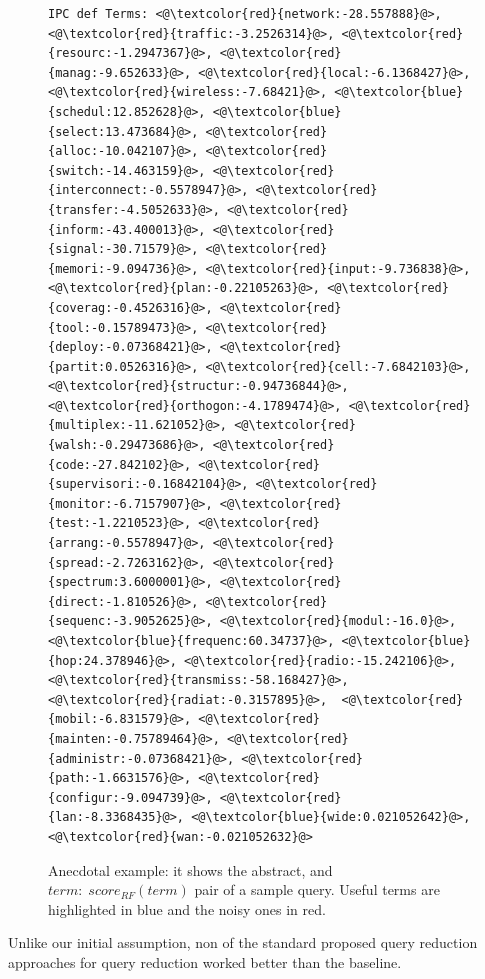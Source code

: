 \begin{figure}[htpb]
\begin{framed}
\begin{lstlisting}[basicstyle=\scriptsize\ttfamily , linewidth=\columnwidth,breaklines=true]
IPC def Terms: <@\textcolor{red}{network:-28.557888}@>, <@\textcolor{red}{traffic:-3.2526314}@>, <@\textcolor{red}{resourc:-1.2947367}@>, <@\textcolor{red}{manag:-9.652633}@>, <@\textcolor{red}{local:-6.1368427}@>, <@\textcolor{red}{wireless:-7.68421}@>, <@\textcolor{blue}{schedul:12.852628}@>, <@\textcolor{blue}{select:13.473684}@>, <@\textcolor{red}{alloc:-10.042107}@>, <@\textcolor{red}{switch:-14.463159}@>, <@\textcolor{red}{interconnect:-0.5578947}@>, <@\textcolor{red}{transfer:-4.5052633}@>, <@\textcolor{red}{inform:-43.400013}@>, <@\textcolor{red}{signal:-30.71579}@>, <@\textcolor{red}{memori:-9.094736}@>, <@\textcolor{red}{input:-9.736838}@>, <@\textcolor{red}{plan:-0.22105263}@>, <@\textcolor{red}{coverag:-0.4526316}@>, <@\textcolor{red}{tool:-0.15789473}@>, <@\textcolor{red}{deploy:-0.07368421}@>, <@\textcolor{red}{partit:0.0526316}@>, <@\textcolor{red}{cell:-7.6842103}@>, <@\textcolor{red}{structur:-0.94736844}@>, <@\textcolor{red}{orthogon:-4.1789474}@>, <@\textcolor{red}{multiplex:-11.621052}@>, <@\textcolor{red}{walsh:-0.29473686}@>, <@\textcolor{red}{code:-27.842102}@>, <@\textcolor{red}{supervisori:-0.16842104}@>, <@\textcolor{red}{monitor:-6.7157907}@>, <@\textcolor{red}{test:-1.2210523}@>, <@\textcolor{red}{arrang:-0.5578947}@>, <@\textcolor{red}{spread:-2.7263162}@>, <@\textcolor{red}{spectrum:3.6000001}@>, <@\textcolor{red}{direct:-1.810526}@>, <@\textcolor{red}{sequenc:-3.9052625}@>, <@\textcolor{red}{modul:-16.0}@>, <@\textcolor{blue}{frequenc:60.34737}@>, <@\textcolor{blue}{hop:24.378946}@>, <@\textcolor{red}{radio:-15.242106}@>, <@\textcolor{red}{transmiss:-58.168427}@>, <@\textcolor{red}{radiat:-0.3157895}@>,  <@\textcolor{red}{mobil:-6.831579}@>, <@\textcolor{red}{mainten:-0.75789464}@>, <@\textcolor{red}{administr:-0.07368421}@>, <@\textcolor{red}{path:-1.6631576}@>, <@\textcolor{red}{configur:-9.094739}@>, <@\textcolor{red}{lan:-8.3368435}@>, <@\textcolor{blue}{wide:0.021052642}@>, <@\textcolor{red}{wan:-0.021052632}@>
 \end{lstlisting} 
 \vspace*{-2ex}
\end{framed}
 \vspace*{-2ex}
  \caption{Anecdotal example: it shows the abstract, and $ term: \; score_{RF}(term) $ pair of a sample query. Useful terms are highlighted in blue and the noisy ones in red.}
  \label{fig:anecdotal}  
\end{figure}

Unlike our initial assumption, non of the standard proposed query reduction approaches for query reduction worked better than the baseline.
